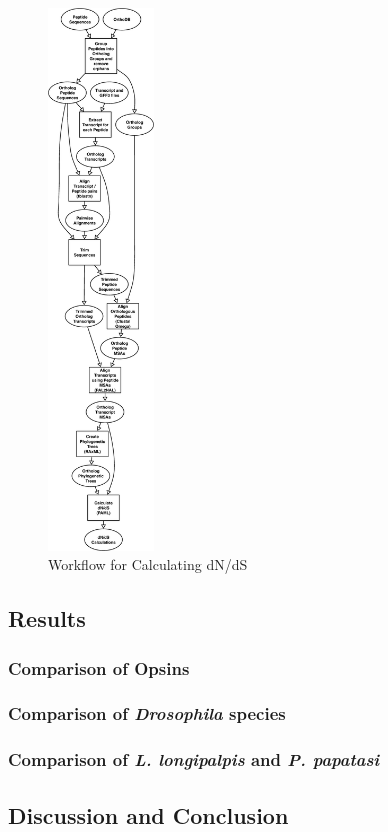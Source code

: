 \begin{figure}[H]
  \centering
  \includegraphics[width=0.25\textwidth]{figures/ka_ks/PAML_workflow}
  \caption{Workflow for Calculating dN/dS}
  \label{fig:ka-ks-workflow}
\end{figure}

\subsection{Results}

\subsubsection{Comparison of Opsins}

\subsubsection{Comparison of \emph{Drosophila} species}

\subsubsection{Comparison of \emph{L. longipalpis} and \emph{P. papatasi}}

\subsection{Discussion and Conclusion}